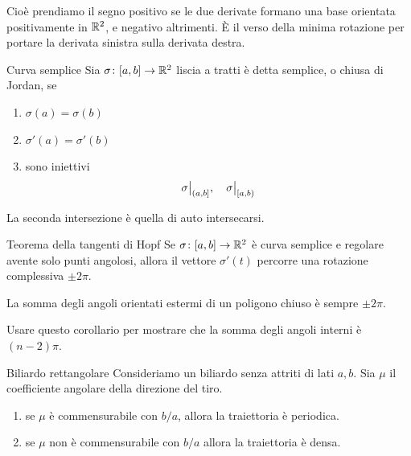 \documentclass[a4paper]{article}
\begin{document}
Cioè prendiamo il segno positivo se le due derivate formano una base orientata positivamente in \(\mathbb{R}^2\),
e negativo altrimenti. È il verso della minima rotazione per portare la derivata sinistra sulla derivata destra.

\begin{snippetdefinition}{Curva semplice}
    Sia \(\sigma \colon [a,b] \to \mathbb{R}^2\) liscia a tratti
    è detta semplice, o chiusa di Jordan, se
    \begin{enumerate}
        \item \(\sigma(a) = \sigma(b)\)
        \item \(\sigma'(a) = \sigma'(b)\)
        \item sono iniettivi
        \[
            \restr{\sigma}{(a, b]}, \quad \restr{\sigma}{[a, b)}
        \]
    \end{enumerate}
\end{snippetdefinition}
La seconda intersezione è quella di auto intersecarsi.
\begin{snippettheorem}{Teorema della tangenti di Hopf}
    Se \(\sigma \colon [a,b] \to \mathbb{R}^2\) è curva semplice e regolare
    avente solo punti angolosi, allora il vettore
    \(\sigma'(t)\) percorre una rotazione complessiva
    \(\pm 2\pi\).
\end{snippettheorem}

\begin{snippetcorollary}{}
    La somma degli angoli orientati estermi di un poligono chiuso è sempre
    \(\pm 2\pi\).
\end{snippetcorollary}

\begin{snippetexercise}{}
    Usare questo corollario per mostrare che la somma degli angoli interni è \((n-2)\pi\).
\end{snippetexercise}

\begin{snippetexample}{Biliardo rettangolare}
    Consideriamo un biliardo senza attriti di lati \(a,b\).
    Sia \(\mu\) il coefficiente angolare della direzione del tiro.
    \begin{enumerate}
        \item se \(\mu\) è commensurabile con
        \(b/a\), allora la traiettoria è periodica.
        \item se \(\mu\) non è commensurabile con \(b/a\) allora la traiettoria è densa.
    \end{enumerate}
\end{snippetexample}
\end{document}
